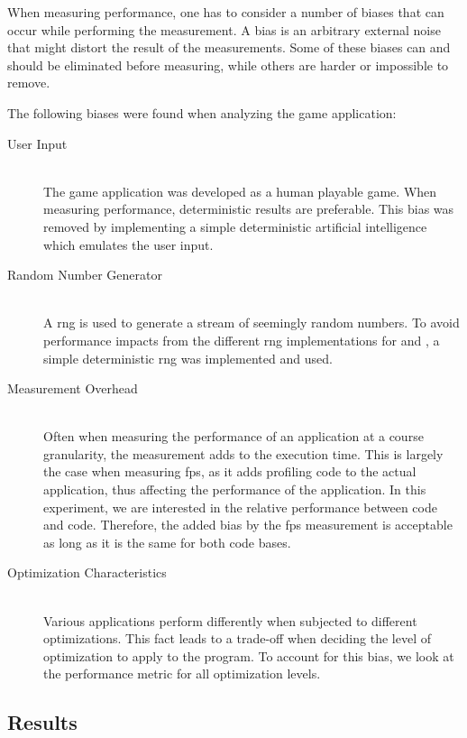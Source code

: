 When measuring performance, one has to consider a number of biases that can occur while performing the measurement.
A bias is an arbitrary external noise that might distort the result of the measurements.
Some of these biases can and should be eliminated before measuring, while others are harder or impossible to remove.

The following biases were found when analyzing the game application:
\begin{description}
  \item [User Input] \hfill \\
The game application was developed as a human playable game.
When measuring performance, deterministic results are preferable.
This bias was removed by implementing a simple deterministic artificial intelligence which emulates the user input.

  \item [Random Number Generator] \hfill \\
A \gls{rng} is used to generate a stream of seemingly random numbers.
To avoid performance impacts from the different \gls{rng} implementations for {\C} and {\rust,} a simple deterministic \gls{rng} was implemented and used.

  \item [Measurement Overhead] \hfill \\
Often when measuring the performance of an application at a course granularity, the measurement adds to the execution time.
This is largely the case when measuring \gls{fps}, as it adds profiling code to the actual application, thus affecting the performance of the application.
In this experiment, we are interested in the relative performance between {\C} code and {\rust} code.
Therefore, the added bias by the \gls{fps} measurement is acceptable as long as it is the same for both code bases.

  \item [Optimization Characteristics] \hfill \\
Various applications perform differently when subjected to different optimizations.
This fact leads to a trade-off when deciding the level of optimization to apply to the program.
To account for this bias, we look at the performance metric for all optimization levels.
\end{description}

\subsection{Results}
\label{sec:perf:res}

